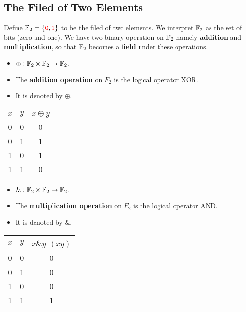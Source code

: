 \subsection{The Filed of Two Elements}
Define $\mathbb{F}_2=\set{\textcolor{red}{\texttt{0}},\textcolor{red}{\texttt{1}}}$ to be the filed of two elements. We interpret $\mathbb{F}_2$ as the set of bits (zero and one). We have two binary operation on $\mathbb{F}_2$ namely \textbf{addition} and \textbf{multiplication}, so that $\mathbb{F}_2$ becomes a \textbf{field} under these operations.
\begin{center}
\begin{minipage}{.48\textwidth}
\begin{itemize}
	\item $\oplus:\mathbb{F}_2\times\mathbb{F}_2\to\mathbb{F}_2$.
	\item The \textbf{addition operation} on $F_2$ is the logical operator XOR.
	\item It is denoted by $\oplus$.
\end{itemize}
\begin{center}
\begin{tabular}{c|c||c}
	\toprule[1.2pt]
	$x$ & $y$ & $x\oplus y$\\
	\hline
	0 & 0 & 0\\
	\hline
	0 & 1 & 1\\
	\hline
	1 & 0 & 1\\
	\hline
	1 & 1 & 0\\
	\bottomrule[1.2pt]
\end{tabular}
\end{center}
\end{minipage}
\begin{minipage}{.48\textwidth}
\begin{itemize}
	\item $\&:\mathbb{F}_2\times\mathbb{F}_2\to\mathbb{F}_2$.
	\item The \textbf{multiplication operation} on $F_2$ is the logical operator AND.
	\item It is denoted by $\&$.
\end{itemize}
\begin{center}
	\begin{tabular}{c|c||c}
		\toprule[1.2pt]
		$x$ & $y$ & $x\& y$ $(xy)$\\
		\hline
		0 & 0 & 0\\
		\hline
		0 & 1 & 0\\
		\hline
		1 & 0 & 0\\
		\hline
		1 & 1 & 1\\
		\bottomrule[1.2pt]
	\end{tabular}
\end{center}
\end{minipage}
\end{center}

